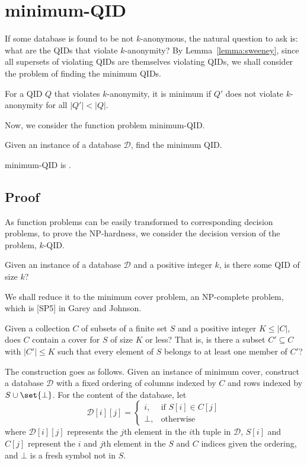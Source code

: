 \documentclass[12pt]{llncs}
\DeclarePairedDelimiter\set\{\}
\newcommand{\cD}{\mathcal{D}}
\begin{document}
\section{minimum-QID}
If some database is found to be not $k$-anonymous, the natural question to ask is: what are the QIDs that violate $k$-anonymity? By Lemma~\ref{lemma:sweeney}, since all supersets of violating QIDs are themselves violating QIDs, we shall consider the problem of finding the minimum QIDs.

\begin{definition}
For a QID $Q$ that violates $k$-anonymity, it is minimum if $Q'$ does not violate $k$-anonymity for all $|Q'| < |Q|$.
\end{definition}

Now, we consider the function problem minimum-QID.

\begin{problem}
Given an instance of a database $\cD$, find the minimum QID.
\end{problem}

\begin{proposition}
minimum-QID is .
\end{proposition}

\subsection{Proof}
As function problems can be easily transformed to corresponding decision problems, to prove the NP-hardness, we consider the decision version of the problem, $k$-QID.

\begin{problem}[$k$-QID]
Given an instance of a database $\cD$ and a positive integer $k$, is there some QID of size $k$?
\end{problem}

We shall reduce it to the minimum cover problem, an NP-complete problem, which is [SP5] in Garey and Johnson\cite{Garey:1990}.

\begin{problem}
Given a collection $C$ of subsets of a finite set $S$ and a positive integer $K \leq |C|$, does $C$ contain a cover for $S$ of size $K$ or less? That is, is there a subset $C' \subseteq C$ with $|C'| \leq K$ such that every element of $S$ belongs to at least one member of $C'$?
\end{problem}

The construction goes as follows. Given an instance of minimum cover, construct a database $\cD$ with a fixed ordering of columns indexed by $C$ and rows indexed by $S \cup \set{\bot}$. For the content of the database, let
$$
\cD[i][j] =
\begin{cases}
    i,    &\text{if } S[i] \in C[j]\\
    \bot, &\text{otherwise}
\end{cases}
$$
where $\cD[i][j]$ represents the $j$th element in the $i$th tuple in $\cD$, $S[i]$ and $C[j]$ represent the $i$ and $j$th element in the $S$ and $C$ indices given the ordering, and $\bot$ is a fresh symbol not in $S$.
\end{document}
